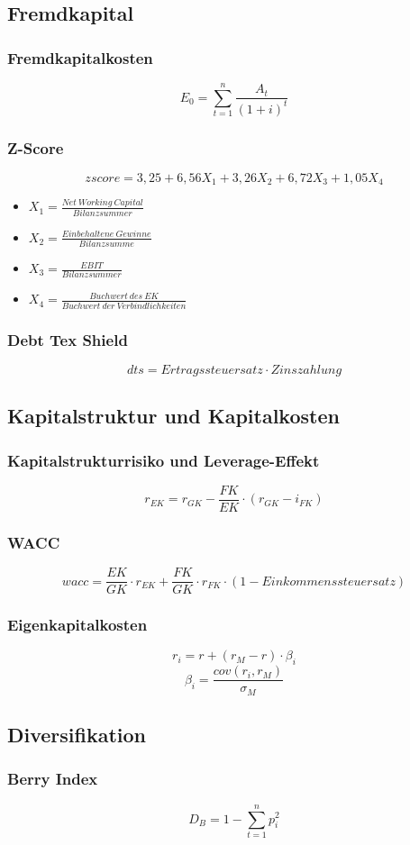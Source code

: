 \subsection{Fremdkapital}

\subsubsection{Fremdkapitalkosten}
\[E_0 = \sum_{t=1}^{n} \frac{A_t}{(1+i)^t}\]

\subsubsection{Z-Score}
\[zscore = 3,25 + 6,56X_1 + 3,26X_2 + 6,72X_3 + 1,05X_4\]
\begin{itemize}
	\item \(X_1 = \frac{Net~Working~Capital}{Bilanzsummer}\)
	\item \(X_2 = \frac{Einbehaltene~Gewinne}{Bilanzsumme}\)
	\item \(X_3 = \frac{EBIT}{Bilanzsummer}\)
	\item \(X_4 = \frac{Buchwert~des~EK}{Buchwert~der~Verbindlichkeiten}\)
\end{itemize}

\subsubsection{Debt Tex Shield}
\[dts = Ertragssteuersatz \cdot Zinszahlung\]


\subsection{Kapitalstruktur und Kapitalkosten}

\subsubsection{Kapitalstrukturrisiko und Leverage-Effekt}
\[r_{EK} = r_{GK} - \frac{FK}{EK} \cdot (r_{GK} - i_{FK})\]

\subsubsection{WACC}
\[wacc = \frac{EK}{GK} \cdot r_{EK} + \frac{FK}{GK} \cdot r_{FK} \cdot (1-Einkommenssteuersatz)\]

\subsubsection{Eigenkapitalkosten}
\[r_i = r + (r_M - r) \cdot \beta_i\]
\[\beta_i = \frac{cov(r_i, r_M)}{\sigma_M}\]


\subsection{Diversifikation}

\subsubsection{Berry Index}
\[D_B = 1 - \sum_{t=1}^{n} p_i^2\]
